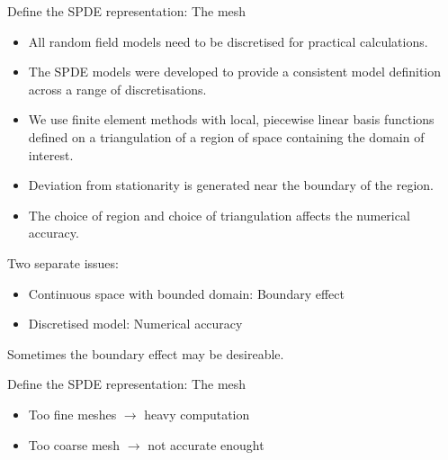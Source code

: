 \documentclass[
  ignorenonframetext,
]{beamer}
\begin{document}
\begin{frame}{Define the SPDE representation: The mesh}
\protect\hypertarget{define-the-spde-representation-the-mesh-1}{}
\footnotesize

\begin{itemize}
\item
  All random field models need to be discretised for practical
  calculations.
\item
  The SPDE models were developed to provide a consistent model
  definition across a range of discretisations.
\item
  We use finite element methods with local, piecewise linear basis
  functions defined on a triangulation of a region of space containing
  the domain of interest.
\item
  Deviation from stationarity is generated near the boundary of the
  region.
\item
  The choice of region and choice of triangulation affects the numerical
  accuracy.
\end{itemize}

\pause

Two separate issues:

\begin{itemize}
\item
  Continuous space with bounded domain: Boundary effect
\item
  Discretised model: Numerical accuracy
\end{itemize}

Sometimes the boundary effect may be desireable.

\normalsize
\end{frame}

\begin{frame}{Define the SPDE representation: The mesh}
\protect\hypertarget{define-the-spde-representation-the-mesh-2}{}
\begin{itemize}
\item
  Too fine meshes \(\rightarrow\) heavy computation
\item
  Too coarse mesh \(\rightarrow\) not accurate enought
\end{itemize}
\end{frame}
\end{document}
